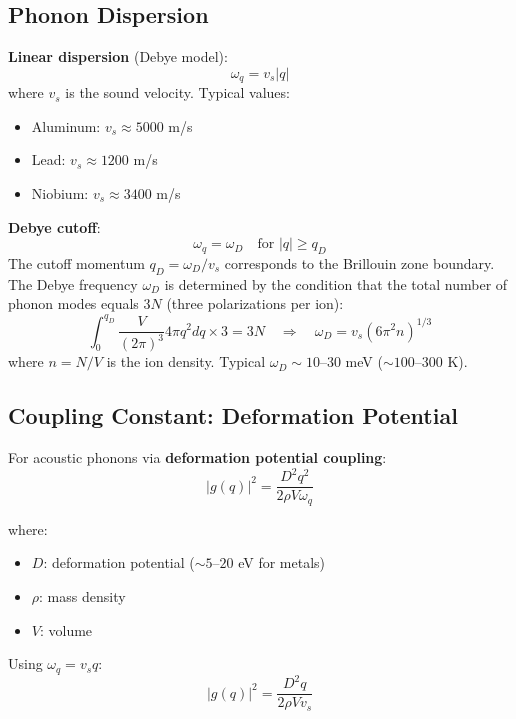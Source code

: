 \documentclass[12pt]{article}
\begin{document}
\subsection{Phonon Dispersion}

\textbf{Linear dispersion} (Debye model):
\begin{equation}
\boxed{
\omega_q = v_s |q|
}
\end{equation}
where $v_s$ is the sound velocity. Typical values:
\begin{itemize}
\item Aluminum: $v_s \approx 5000$ m/s
\item Lead: $v_s \approx 1200$ m/s
\item Niobium: $v_s \approx 3400$ m/s
\end{itemize}

\textbf{Debye cutoff}:
\begin{equation}
\omega_q = \omega_D \quad \text{for } |q| \geq q_D
\end{equation}
The cutoff momentum $q_D = \omega_D / v_s$ corresponds to the Brillouin zone boundary. The Debye frequency $\omega_D$ is determined by the condition that the total number of phonon modes equals $3N$ (three polarizations per ion):
\begin{equation}
\int_0^{q_D} \frac{V}{(2\pi)^3} 4\pi q^2 dq \times 3 = 3N \quad \Rightarrow \quad \omega_D = v_s(6\pi^2 n)^{1/3}
\end{equation}
where $n = N/V$ is the ion density. Typical $\omega_D \sim 10\text{--}30$ meV ($\sim 100\text{--}300$ K).

\subsection{Coupling Constant: Deformation Potential}

For acoustic phonons via \textbf{deformation potential coupling}:
\begin{equation}
\boxed{
|g(q)|^2 = \frac{D^2 q^2}{2\rho V \omega_q}
}
\end{equation}

where:
\begin{itemize}
\item $D$: deformation potential ($\sim 5\text{--}20$ eV for metals)
\item $\rho$: mass density
\item $V$: volume
\end{itemize}

Using $\omega_q = v_s q$:
\begin{equation}
|g(q)|^2 = \frac{D^2 q}{2\rho V v_s}
\end{equation}
\end{document}
